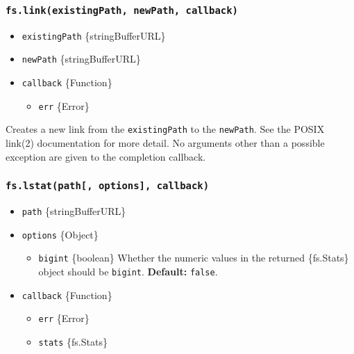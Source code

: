\subsubsection{\texorpdfstring{\texttt{fs.link(existingPath,\ newPath,\ callback)}}{fs.link(existingPath, newPath, callback)}}\label{fs.linkexistingpath-newpath-callback}

\begin{itemize}
\tightlist
\item
  \texttt{existingPath} \{string\textbar Buffer\textbar URL\}
\item
  \texttt{newPath} \{string\textbar Buffer\textbar URL\}
\item
  \texttt{callback} \{Function\}

  \begin{itemize}
  \tightlist
  \item
    \texttt{err} \{Error\}
  \end{itemize}
\end{itemize}

Creates a new link from the \texttt{existingPath} to the
\texttt{newPath}. See the POSIX link(2) documentation for more detail.
No arguments other than a possible exception are given to the completion
callback.

\subsubsection{\texorpdfstring{\texttt{fs.lstat(path{[},\ options{]},\ callback)}}{fs.lstat(path{[}, options{]}, callback)}}\label{fs.lstatpath-options-callback}

\begin{itemize}
\tightlist
\item
  \texttt{path} \{string\textbar Buffer\textbar URL\}
\item
  \texttt{options} \{Object\}

  \begin{itemize}
  \tightlist
  \item
    \texttt{bigint} \{boolean\} Whether the numeric values in the
    returned \{fs.Stats\} object should be \texttt{bigint}.
    \textbf{Default:} \texttt{false}.
  \end{itemize}
\item
  \texttt{callback} \{Function\}

  \begin{itemize}
  \tightlist
  \item
    \texttt{err} \{Error\}
  \item
    \texttt{stats} \{fs.Stats\}
  \end{itemize}
\end{itemize}

